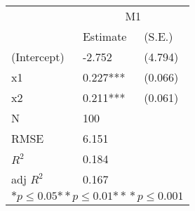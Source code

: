 \begin{tabular}{*{3}{l}}
\hline
                  & \multicolumn{2}{c}{M1}   \tabularnewline
                   &Estimate  &(S.E.)  \tabularnewline
 \hline
 \hline
   (Intercept)     &-2.752   &   (4.794) \tabularnewline
   x1              &0.227***   &   (0.066) \tabularnewline
   x2              &0.211***   &   (0.061) \tabularnewline
 \hline
 N                 &100       &        \tabularnewline
 RMSE             &6.151         & \tabularnewline
 $R^2$             &0.184         & \tabularnewline
 adj $R^2$         &0.167         & \tabularnewline
 \hline
\hline
 
 \multicolumn{3}{c}{${*  p}\le 0.05$${*\!\!*  p}\le 0.01$${*\!\!*\!\!*  p}\le 0.001$}\tabularnewline
 \end{tabular}